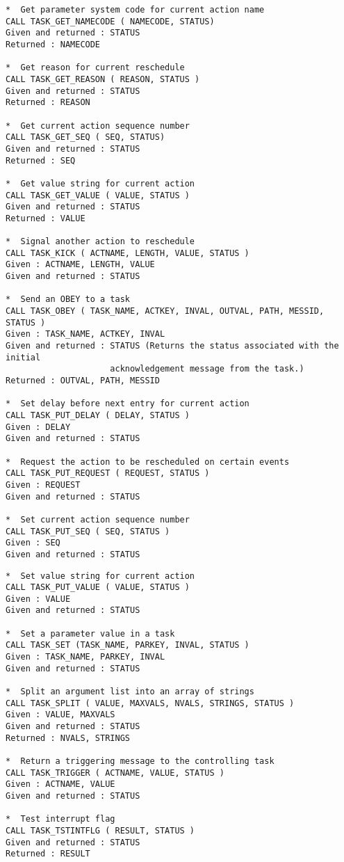 \documentclass[twoside,11pt]{article}
\renewcommand{\_}{\texttt{\symbol{95}}}
\begin{document}
\begin{verbatim}
*  Get parameter system code for current action name
CALL TASK_GET_NAMECODE ( NAMECODE, STATUS)
Given and returned : STATUS
Returned : NAMECODE

*  Get reason for current reschedule
CALL TASK_GET_REASON ( REASON, STATUS )
Given and returned : STATUS
Returned : REASON

*  Get current action sequence number
CALL TASK_GET_SEQ ( SEQ, STATUS)
Given and returned : STATUS
Returned : SEQ

*  Get value string for current action
CALL TASK_GET_VALUE ( VALUE, STATUS )
Given and returned : STATUS
Returned : VALUE

*  Signal another action to reschedule
CALL TASK_KICK ( ACTNAME, LENGTH, VALUE, STATUS )
Given : ACTNAME, LENGTH, VALUE
Given and returned : STATUS

*  Send an OBEY to a task
CALL TASK_OBEY ( TASK_NAME, ACTKEY, INVAL, OUTVAL, PATH, MESSID, STATUS )
Given : TASK_NAME, ACTKEY, INVAL
Given and returned : STATUS (Returns the status associated with the initial
                     acknowledgement message from the task.)
Returned : OUTVAL, PATH, MESSID

*  Set delay before next entry for current action
CALL TASK_PUT_DELAY ( DELAY, STATUS )
Given : DELAY
Given and returned : STATUS

*  Request the action to be rescheduled on certain events
CALL TASK_PUT_REQUEST ( REQUEST, STATUS )
Given : REQUEST
Given and returned : STATUS

*  Set current action sequence number
CALL TASK_PUT_SEQ ( SEQ, STATUS )
Given : SEQ
Given and returned : STATUS
\end{verbatim}
\newpage
\begin{verbatim}
*  Set value string for current action
CALL TASK_PUT_VALUE ( VALUE, STATUS )
Given : VALUE
Given and returned : STATUS

*  Set a parameter value in a task
CALL TASK_SET (TASK_NAME, PARKEY, INVAL, STATUS )
Given : TASK_NAME, PARKEY, INVAL
Given and returned : STATUS

*  Split an argument list into an array of strings
CALL TASK_SPLIT ( VALUE, MAXVALS, NVALS, STRINGS, STATUS )
Given : VALUE, MAXVALS
Given and returned : STATUS
Returned : NVALS, STRINGS

*  Return a triggering message to the controlling task
CALL TASK_TRIGGER ( ACTNAME, VALUE, STATUS )
Given : ACTNAME, VALUE
Given and returned : STATUS

*  Test interrupt flag
CALL TASK_TSTINTFLG ( RESULT, STATUS )
Given and returned : STATUS
Returned : RESULT
\end{verbatim}
\end{document}
